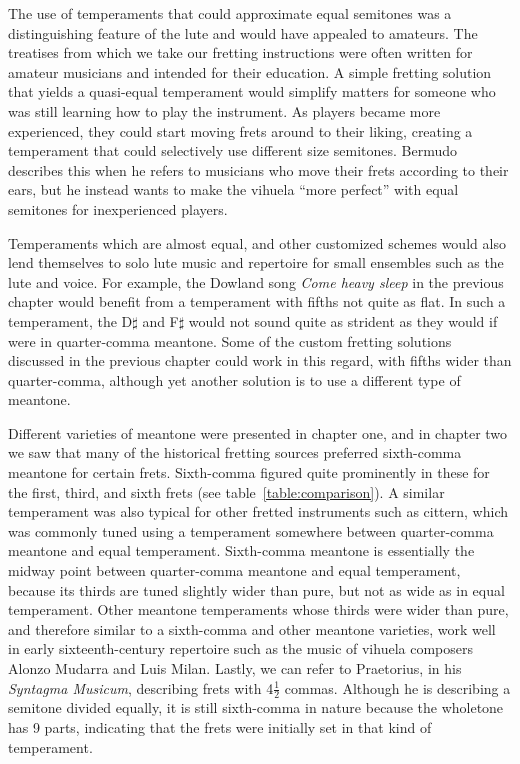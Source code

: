 The use of temperaments that could approximate equal semitones was a distinguishing
feature of the lute and would have appealed to amateurs. The treatises from which we
take our fretting instructions were often written for amateur musicians and intended
for their education. A simple fretting solution that yields a quasi-equal temperament
would simplify matters for someone who was still learning how to play the instrument.
As players became more experienced, they could start moving frets around to their
liking, creating a temperament that could selectively use different size
semitones. Bermudo describes this when he refers to musicians who move their
frets according to their ears, but he instead wants to make the vihuela ``more
perfect'' with equal semitones for inexperienced players.\autocite[78]{DE:1}

Temperaments which are almost equal, and other customized schemes would also
lend themselves to solo lute music and repertoire for small ensembles such as
the lute and voice. For example, the Dowland song \textit{Come heavy sleep} in
the previous chapter would benefit from a temperament with fifths not quite as
flat.  In such a temperament,  the D$\sharp$ and F$\sharp$ would not sound quite
as strident as they would if were in quarter-comma meantone. Some of the custom
fretting solutions discussed in the previous chapter could work in this regard,
with fifths wider than quarter-comma, although yet another solution is to use a
different type of meantone.

Different varieties of meantone were presented in chapter one, and in chapter two we saw
that many of the historical fretting sources preferred sixth-comma meantone for certain
frets.   Sixth-comma figured quite prominently in these for the first, third, and sixth
frets (see table~\ref{table:comparison}). A similar temperament was also typical for
other fretted instruments such as cittern, which was commonly tuned using a
temperament somewhere between quarter-comma meantone and equal temperament.
\autocite[12]{PF:1}  Sixth-comma meantone is essentially the midway point between
quarter-comma meantone and equal temperament, because its thirds are tuned slightly
wider than pure, but not as wide as in equal temperament. Other meantone
temperaments whose thirds were wider than pure, and therefore similar to a sixth-comma
and other meantone varieties, work well in early sixteenth-century repertoire such as
the music of vihuela composers Alonzo Mudarra and Luis Milan.\autocite[56]{WH:1}
Lastly, we can refer to Praetorius, in his \textit{Syntagma Musicum}, describing
frets with 4$ \frac{1}{2} $ commas.\autocite[68]{MP:1} Although he is describing a
semitone divided equally, it is still sixth-comma in nature because the wholetone has 9
parts, indicating that the frets were initially set in that kind of temperament.

